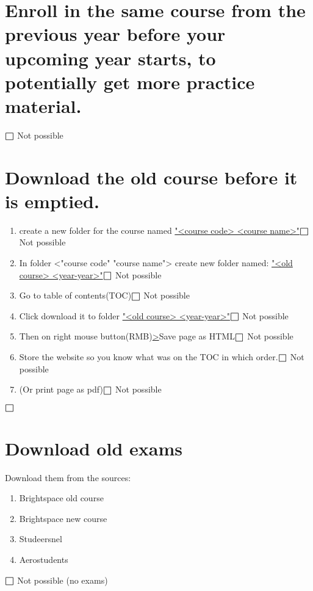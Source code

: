 \newpage
\setcounter{section}{0} 
\section{Enroll in the same course from the previous year before your upcoming year starts, to potentially get more practice material.}
$\msquare$ 
Not possible
\section{Download the old course before it is emptied.}
\begin{enumerate}
    \item create a new folder for the course named \url{"<course code> <course name>"}$\msquare$ 
    Not possible
    \item In folder <"course code" "course name"> create new folder named: \url{"<old course> <year-year>"}$\msquare$
    Not possible
    \item Go to table of contents(TOC)$\msquare$
    Not possible
    \item Click download it to folder \url{"<old course> <year-year>"}$\msquare$
    Not possible
    \item Then on right mouse button(RMB)\url{>}Save page as HTML$\msquare$
    Not possible
    \item Store the website so you know what was on the TOC in which
    order.$\msquare$
    Not possible
    \item (Or print page as pdf)$\msquare$
    Not possible
\end{enumerate}
$\msquare$

\section{Download old exams}
Download them from the sources:
\begin{enumerate}
	\item Brightspace old course
	\item Brightspace new course
	\item Studeersnel
	\item Aerostudents
\end{enumerate}
$\msquare$
    Not possible (no exams)

